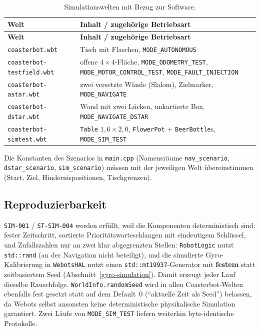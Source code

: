 \documentclass[
  a4paper,
  12pt,
  DIV=12,        %
  parskip=half,  %
  headings=small %
]{scrartcl}
\theoremstyle{definition}
\theoremstyle{definition}
\begin{document}
\begin{longtable}[]{@{}p{}p{}@{}}
\caption{Simulationswelten mit Bezug zur Software.}\label{tab:welten}\\
\toprule
\textbf{Welt} & \textbf{Inhalt / zugehörige Betriebsart}\\
\midrule
\endfirsthead
\toprule
\textbf{Welt} & \textbf{Inhalt / zugehörige Betriebsart}\\
\midrule
\endhead
\bottomrule
\endfoot
\small \texttt{coasterbot.wbt} & Tisch mit Flaschen, \texttt{MODE\_AUTONOMOUS}\\
\small \texttt{coasterbot-testfield.wbt} & offene $4\times4$-Fläche, \texttt{MODE\_ODOMETRY\_TEST}, \texttt{MODE\_MOTOR\_CONTROL\_TEST}, \texttt{MODE\_FAULT\_INJECTION}\\
\small \texttt{coasterbot-astar.wbt} & zwei versetzte Wände (Slalom), Zielmarker, \texttt{MODE\_NAVIGATE}\\
\small \texttt{coasterbot-dstar.wbt} & Wand mit zwei Lücken, unkartierte Box, \texttt{MODE\_NAVIGATE\_DSTAR}\\
\small \texttt{coasterbot-simtest.wbt} & \texttt{Table} $1{,}6\times2{,}0$, \texttt{FlowerPot} + \texttt{BeerBottle}s, \texttt{MODE\_SIM\_TEST}\\
\bottomrule
\end{longtable}

Die Konstanten des Szenarios in \texttt{main.cpp} (Namensräume
\texttt{nav\_scenario}, \texttt{dstar\_scenario}, \texttt{sim\_scenario})
müssen mit der jeweiligen Welt übereinstimmen (Start, Ziel,
Hindernispositionen, Tischgrenzen).

\subsection{Reproduzierbarkeit}\label{reproduzierbarkeit}

\texttt{SIM-001} / \texttt{ST-SIM-004} werden erfüllt, weil die
Komponenten deterministisch sind: fester Zeitschritt, sortierte
Prioritätswarteschlangen mit eindeutigem Schlüssel, und Zufallszahlen nur
an zwei klar abgegrenzten Stellen: \texttt{RobotLogic} nutzt
\texttt{std::rand} (an der Navigation nicht beteiligt), und die simulierte
Gyro-Kalibrierung in \texttt{WebotsHAL} nutzt einen
\texttt{std::mt19937}-Generator mit \textbf{festem} statt zeitbasiertem
Seed (Abschnitt~\ref{gyro-simulation}). Damit erzeugt jeder Lauf
dieselbe Rauschfolge. \texttt{WorldInfo.randomSeed} wird in allen
Coasterbot-Welten ebenfalls fest gesetzt statt auf dem Default~0
(\enquote{aktuelle Zeit als Seed}) belassen, da Webots selbst ansonsten
keine deterministische physikalische Simulation garantiert. Zwei
Läufe von \texttt{MODE\_SIM\_TEST} liefern weiterhin byte-identische
Protokolle.
\end{document}
